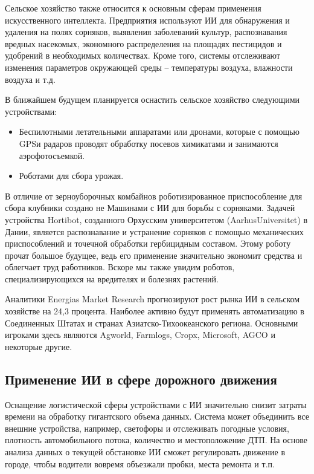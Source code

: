 \documentclass[bachelor,och,referat]{SCWorks_corrected}
\begin{document}
Сельское хозяйство также относится к основным сферам применения искусственного интеллекта. Предприятия используют ИИ для обнаружения и удаления на полях сорняков, выявления заболеваний культур, распознавания вредных насекомых, экономного распределения на площадях пестицидов и удобрений в необходимых количествах. Кроме того, системы отслеживают изменения параметров окружающей среды – температуры воздуха, влажности воздуха и т.д.

В ближайшем будущем планируется оснастить сельское хозяйство следующими устройствами:
    
\begin{itemize}
    \item{Беспилотными летательными аппаратами или дронами, которые с помощью GPSи радаров проводят обработку посевов химикатами и занимаются аэрофотосъемкой.}
    \item{Роботами для сбора урожая.}
\end{itemize}

В отличие от зерноуборочных комбайнов роботизированное приспособление для сбора клубники создано не Машинами с ИИ для борьбы с сорняками. Задачей устройства Hortibot, созданного Орхусским университетом (AarhusUniversitet) в Дании, является распознавание и устранение сорняков с помощью механических приспособлений и точечной обработки гербицидным составом. Этому роботу прочат большое будущее, ведь его применение значительно экономит средства и облегчает труд работников. Вскоре мы также увидим роботов, специализирующихся на вредителях и болезнях растений.

Аналитики Energias Market Research прогнозируют рост рынка ИИ в сельском хозяйстве на 24,3 процента. Наиболее активно будут применять автоматизацию в Соединенных Штатах и странах Азиатско-Тихоокеанского региона. Основными игроками здесь являются Agworld, Farmlogs, Cropx, Microsoft, AGCO и некоторые другие.

\subsection{Применение ИИ в сфере дорожного движения}
    
Оснащение логистической сферы устройствами с ИИ значительно снизит затраты времени на обработку гигантского объема данных. Система может объединить все внешние устройства, например, светофоры и отслеживать погодные условия, плотность автомобильного потока, количество и местоположение ДТП. На основе анализа данных о текущей обстановке ИИ сможет регулировать движение в городе, чтобы водители вовремя объезжали пробки, места ремонта и т.п.
\end{document}

